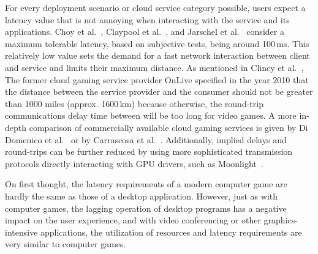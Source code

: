 \documentclass[runningheads]{llncs}
\begin{document}
For every deployment scenario or cloud service category possible,
users expect a latency value that is not annoying
when interacting with the service and its applications.
Choy et al.~\cite{ChoyWongSimonRosenberg2012},
Claypool et al.~\cite{claypool2010latency},
and Jarschel et al.~\cite{jarschel2011evaluation}
consider a maximum tolerable latency, based on subjective tests,
being around 100\,ms.
This relatively low value sets the demand for a fast network interaction
between client and service and limits their maximum distance.
As mentioned in Clincy et al.~\cite{clincy2013subjective},
The former cloud gaming service provider OnLive specified in the year 2010
that the distance between the service provider and the consumer
should not be greater than 1000 miles (approx. 1600\,km) because otherwise,
the round-trip communications delay time between will be too long for video games.
A more in-depth comparison of
commercially available cloud gaming services is given
by Di Domenico et al.~\cite{di2021network}
or by Carrascosa et al.~\cite{carrascosa2022cloud}.
Additionally, implied delays and round-trips can be further reduced
by using more sophisticated transmission protocols
directly interacting with GPU drivers,
such as Moonlight~\cite{darcy2022latency,hanimplementation}.

On first thought, the latency requirements of a modern computer game
are hardly the same as those of a desktop application.
However, just as with computer games,
the lagging operation of desktop programs
has a negative impact on the user experience,
and with video conferencing or other graphics-intensive applications,
the utilization of resources and latency requirements
are very similar to computer games.
\end{document}

